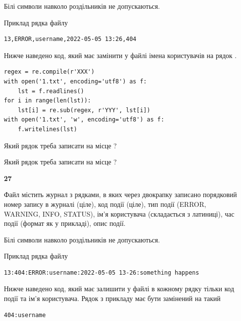 Білі символи навколо роздільників не допускаються.

Приклад рядка файлу



\begin{verbatim}
13,ERROR,username,2022-05-05 13:26,404
\end{verbatim}


Нижче наведено код, який має замінити у файлі імена користувачів на рядок .



\begin{verbatim}
regex = re.compile(r'XXX')
with open('1.txt', encoding='utf8') as f:
    lst = f.readlines()
for i in range(len(lst)):
    lst[i] = re.sub(regex, r'YYY', lst[i])
with open('1.txt', 'w', encoding='utf8') as f:
    f.writelines(lst)
\end{verbatim}







Який рядок треба записати на місце  ?\par
\vspace{5mm}


Який рядок треба записати на місце  ?\par


\newpage

{\begin {center}\textbf{ 27}\end {center}}\par
Файл  містить журнал з рядками, в яких через двокрапку записано поряд\-ко\-вий номер запису в журналі (ціле), код події (ціле), тип події (ERROR, \\WARNING, INFO, STATUS), ім'я користувача (складається з латиниці), час події (фор\-мат як у прикладі), опис події.

Білі символи навколо роздільників не допускаються.

Приклад рядка файлу



\begin{verbatim}
13:404:ERROR:username:2022-05-05 13-26:something happens
\end{verbatim}


Нижче наведено код, який має залишити у файлі в кожному рядку тільки код події та ім'я користувача. Рядок з прикладу має бути замінений на такий



\begin{verbatim}
404:username
\end{verbatim}




